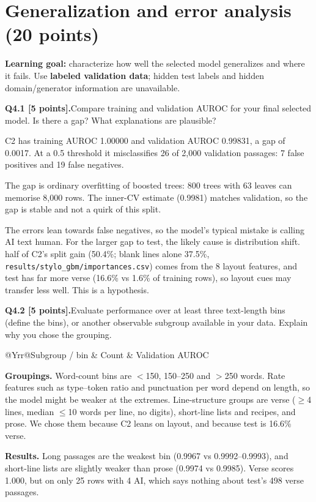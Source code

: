 \documentclass[11pt,letterpaper]{article}
\newcommand{\question}[2]{\needspace{4\baselineskip}\par\addvspace{0.45em}\noindent\textbf{#1}\quad #2\par\nobreak\vspace{0.1em}}
\begin{document}
\newpage
\section{Generalization and error analysis (20 points)}
\textbf{Learning goal:} characterize how well the selected model generalizes and where it fails. Use \textbf{labeled validation data}; hidden test labels and hidden domain/generator information are unavailable.

\question{Q4.1 [5 points].}{Compare training and validation AUROC for your final selected model. Is there a gap? What explanations are plausible?}
C2 has training AUROC 1.00000 and validation AUROC 0.99831, a gap of 0.0017. At a 0.5 threshold it misclassifies 26 of 2,000 validation passages: 7 false positives and 19 false negatives.

The gap is ordinary overfitting of boosted trees: 800 trees with 63 leaves can memorise 8,000 rows. The inner-CV estimate (0.9981) matches validation, so the gap is stable and not a quirk of this split.

The errors lean towards false negatives, so the model's typical mistake is calling AI text human. For the larger gap to test, the likely cause is distribution shift. half of C2's split gain (50.4\%; blank lines alone 37.5\%, \texttt{results/stylo\_gbm/importances.csv}) comes from the 8 layout features, and test has far more verse (16.6\% vs 1.6\% of training rows), so layout cues may transfer less well. This is a hypothesis.

\question{Q4.2 [5 points].}{Evaluate performance over at least three text-length bins (define the bins), or another observable subgroup available in your data. Explain why you chose the grouping.}
\begin{tabularx}{\linewidth}{@{}Yrr@{}}\toprule Subgroup / bin & Count & Validation AUROC \\ \midrule
{}
\bottomrule\end{tabularx}
\textbf{Groupings.} Word-count bins are $<$150, 150--250 and $>$250 words. Rate features such as type--token ratio and punctuation per word depend on length, so the model might be weaker at the extremes. Line-structure groups are verse ($\ge$4 lines, median $\le$10 words per line, no digits), short-line lists and recipes, and prose. We chose them because C2 leans on layout, and because test is 16.6\% verse.

\textbf{Results.} Long passages are the weakest bin (0.9967 vs 0.9992--0.9993), and short-line lists are slightly weaker than prose (0.9974 vs 0.9985). Verse scores 1.000, but on only 25 rows with 4 AI, which says nothing about test's 498 verse passages.
\end{document}

